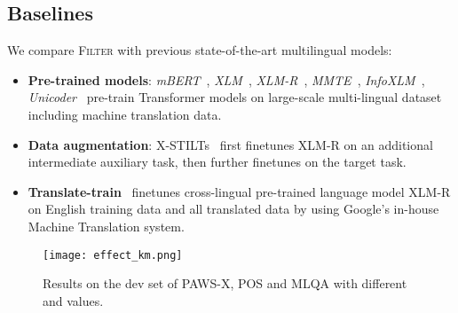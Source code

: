 \subsection{Baselines}
We compare \textsc{Filter} with previous state-of-the-art multilingual models: \begin{itemize}[itemsep=1pt,topsep=2pt,leftmargin=12pt]
\item \textbf{Pre-trained models}: \textit{mBERT}~\cite{devlin-etal-2019-bert}, \textit{XLM}~\cite{lample2019cross}, \textit{XLM-R}~\cite{conneau2019unsupervised}, \textit{MMTE}~\cite{siddhant2020evaluating}, \textit{InfoXLM}~\cite{chi2020infoxlm},
\textit{Unicoder}~\cite{huang2019unicoder} pre-train Transformer models on large-scale multi-lingual dataset including machine translation data.
\item \textbf{Data augmentation}: 	X-STILTs~\cite{phang2020english} first finetunes XLM-R on an additional intermediate auxiliary task, then further finetunes on the target task.
\item \textbf{Translate-train}~\cite{hu2020xtreme} finetunes cross-lingual pre-trained language model XLM-R on  English training data and all translated data by using Google's in-house Machine Translation system.


\end{itemize}

\begin{figure*}[t]
\centering
\texttt{[image: effect\_km.png]}
\caption{Results on the dev set of PAWS-X, POS and MLQA  with different  and  values.}
\label{fig:abl_km}
\end{figure*}


\begin{table*}[t!]
\centering
{}
\caption{Analysis on cross-lingual transfer gap of different models on XTREME benchmark (except for retrieval  task). A lower gap indicates a better cross-lingual transfer model. 
The average score (Avg) is calculated on all classification and QA tasks. 
}
\label{tbl:trans_gap}
\end{table*} 
